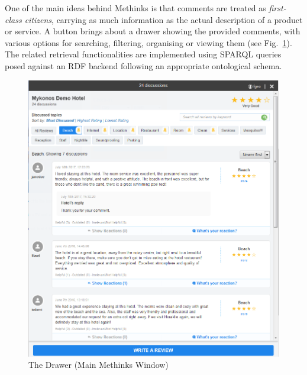 \documentclass[runningheads,a4paper]{llncs}
\makeatletter
\def\maxwidth#1{\ifdim\Gin@nat@width>#1 #1\else\Gin@nat@width\fi}
\makeatother
\begin{document}
One of the main ideas behind Methinks is that comments are treated as {\em first-class citizens}, carrying as much information as the actual description of a product or service. A button brings about a drawer showing the provided comments, with various options for searching, filtering, organising or viewing them (see Fig.~\ref{_Ref490739495}). The related retrieval functionalities are implemented using SPARQL queries posed against an RDF backend following an appropriate ontological schema.
\begin{figure}[h!]
\centering
\includegraphics[width=\maxwidth{\textwidth}]{./img/image1.png}
\cprotect\caption{  The  Drawer (Main Methinks Window)}
\label{_Ref490739495}
\end{figure}
\end{document}
